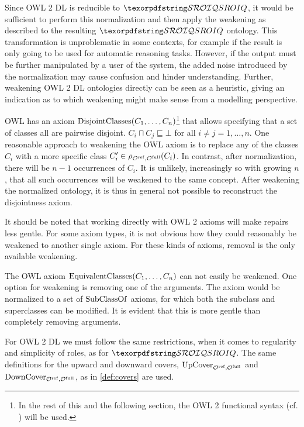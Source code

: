 Since OWL 2 DL is reducible to $\SROIQ$, it would be sufficient to perform this normalization and then apply the weakening as described to the resulting $\SROIQ$ ontology. This transformation is unproblematic in some contexts, for example if the result is only going to be used for automatic reasoning tasks. However, if the output must be further manipulated by a user of the system, the added noise introduced by the normalization may cause confusion and hinder understanding. Further, weakening OWL 2 DL ontologies directly can be seen as a heuristic, giving an indication as to which weakening might make sense from a modelling perspective.

\begin{example}
  OWL has an axiom $\operatorname{DisjointClasses}(C_1, \dots, C_n)$\footnote{In the rest of this and the following section, the OWL 2 functional syntax (cf. \cite{motik2012ontology}) will be used.} that allows specifying that a set of classes all are pairwise disjoint. $C_i \sqcap C_j \sqsubseteq \bot$ for all $i \not= j = 1, \dots, n$. One reasonable approach to weakening the OWL axiom is to replace any of the classes $C_i$ with a more specific class $C_i' \in \rho_{{\mathcal{O}^\textnormal{ref}},{\mathcal{O}^\textnormal{full}}}(C_i)$. In contrast, after normalization, there will be $n - 1$ occurrences of $C_i$. It is unlikely, increasingly so with growing $n$, that all such occurrences will be weakened to the same concept. After weakening the normalized ontology, it is thus in general not possible to reconstruct the disjointness axiom.
\end{example}

It should be noted that working directly with OWL 2 axioms will make repairs less gentle. For some axiom types, it is not obvious how they could reasonably be weakened to another single axiom. For these kinds of axioms, removal is the only available weakening.

\begin{example}
  The OWL axiom $\operatorname{EquivalentClasses}(C_1, \dots, C_n)$ can not easily be weakened. One option for weakening is removing one of the arguments. The axiom would be normalized to a set of $\operatorname{SubClassOf}$ axioms, for which both the subclass and superclasses can be modified. It is evident that this is more gentle than completely removing arguments.
\end{example}

For OWL 2 DL we must follow the same restrictions, when it comes to regularity and simplicity of roles, as for $\SROIQ$. The same definitions for the upward and downward covers, ${\operatorname{UpCover}}_{{\mathcal{O}^\textnormal{ref}},{\mathcal{O}^\textnormal{full}}}$ and ${\operatorname{DownCover}}_{{\mathcal{O}^\textnormal{ref}},{\mathcal{O}^\textnormal{full}}}$, as in \cref{def:covers} are used.

